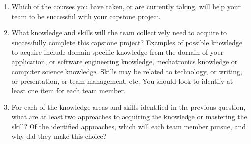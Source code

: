 \documentclass[12pt, titlepage]{article}
\begin{document}
\begin{enumerate}
  \item Which of the courses you have taken, or are currently taking, will help
  your team to be successful with your capstone project.
  \item What knowledge and skills will the team collectively need to acquire to
  successfully complete this capstone project?  Examples of possible knowledge
  to acquire include domain specific knowledge from the domain of your
  application, or software engineering knowledge, mechatronics knowledge or
  computer science knowledge.  Skills may be related to technology, or writing,
  or presentation, or team management, etc.  You should look to identify at
  least one item for each team member.
  \item For each of the knowledge areas and skills identified in the previous
  question, what are at least two approaches to acquiring the knowledge or
  mastering the skill?  Of the identified approaches, which will each team
  member pursue, and why did they make this choice?
\end{enumerate}
\end{document}
